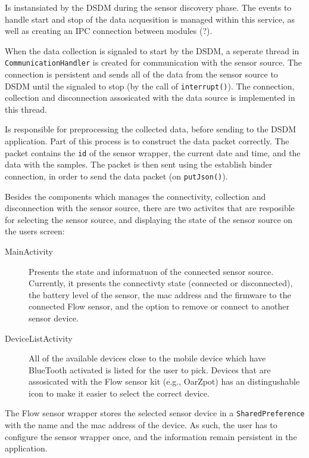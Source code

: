 \begin{description}[font=\normalfont\itshape]
    \item[WrapperService] Is instansiated by the DSDM during the sensor discovery phase. The events to handle start and stop of the data acquesition is managed within this service, as well as creating an IPC connection between modules (?). 
    \item[CommunicationHandler] When the data collection is signaled to start by the DSDM, a seperate thread in \verb|CommunicationHandler| is created for communication with the sensor source. The connection is persistent and sends all of the data from the sensor source to DSDM until the signaled to stop (by the call of \verb|interrupt()|). The connection, collection and disconnection assosicated with the data source is implemented in this thread.
    \item[DataHandler] Is responsible for preprocessing the collected data, before sending to the DSDM application. Part of this process is to construct the data packet correctly. The packet contains the \verb|id| of the sensor wrapper, the current date and time, and the data with the samples. The packet is then sent using the establish binder connection, in order to send the data packet (on \verb|putJson()|).
\end{description}

Besides the components which manages the connectivity, collection and disconnection with the sensor source, there are two activites that are resposible for selecting the sensor source, and displaying the state of the sensor source on the users screen:
\begin{description}
    \item[MainActivity] Presents the state and informatuon of the connected sensor source. Currently, it presents the connectivty state (connected or disconnected), the battery level of the sensor, the mac address and the firmware to the connected Flow sensor, and the option to remove or connect to another sensor device. 
    \item[DeviceListActivity] All of the available devices close to the mobile device which have BlueTooth activated is listed for the user to pick. Devices that are assosicated with the Flow sensor kit (e.g., OarZpot) has an distingushable icon to make it easier to select the correct device. 
\end{description}
The Flow sensor wrapper stores the selected sensor device in a \verb|SharedPreference| with the name and the mac address of the device. As such, the user has to configure the sensor wrapper once, and the information remain persistent in the application.   

